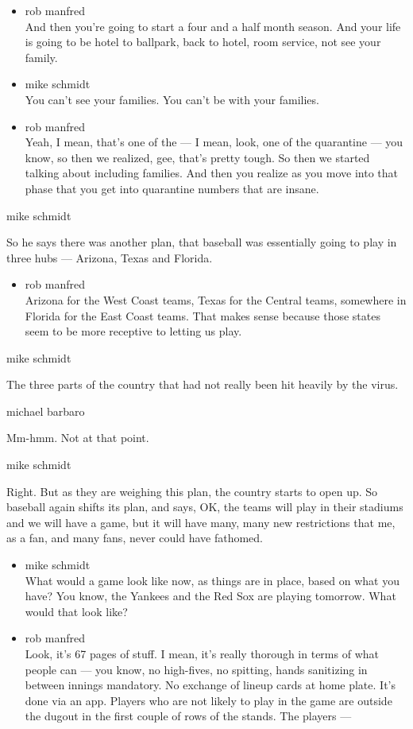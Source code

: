 \begin{itemize}
\item
  rob manfred\\
  And then you're going to start a four and a half month season. And
  your life is going to be hotel to ballpark, back to hotel, room
  service, not see your family.
\item
  mike schmidt\\
  You can't see your families. You can't be with your families.
\item
  rob manfred\\
  Yeah, I mean, that's one of the --- I mean, look, one of the
  quarantine --- you know, so then we realized, gee, that's pretty
  tough. So then we started talking about including families. And then
  you realize as you move into that phase that you get into quarantine
  numbers that are insane.
\end{itemize}

mike schmidt

So he says there was another plan, that baseball was essentially going
to play in three hubs --- Arizona, Texas and Florida.

\begin{itemize}
\tightlist
\item
  rob manfred\\
  Arizona for the West Coast teams, Texas for the Central teams,
  somewhere in Florida for the East Coast teams. That makes sense
  because those states seem to be more receptive to letting us play.
\end{itemize}

mike schmidt

The three parts of the country that had not really been hit heavily by
the virus.

michael barbaro

Mm-hmm. Not at that point.

mike schmidt

Right. But as they are weighing this plan, the country starts to open
up. So baseball again shifts its plan, and says, OK, the teams will play
in their stadiums and we will have a game, but it will have many, many
new restrictions that me, as a fan, and many fans, never could have
fathomed.

\begin{itemize}
\item
  mike schmidt\\
  What would a game look like now, as things are in place, based on what
  you have? You know, the Yankees and the Red Sox are playing tomorrow.
  What would that look like?
\item
  rob manfred\\
  Look, it's 67 pages of stuff. I mean, it's really thorough in terms of
  what people can --- you know, no high-fives, no spitting, hands
  sanitizing in between innings mandatory. No exchange of lineup cards
  at home plate. It's done via an app. Players who are not likely to
  play in the game are outside the dugout in the first couple of rows of
  the stands. The players ---
\end{itemize}

